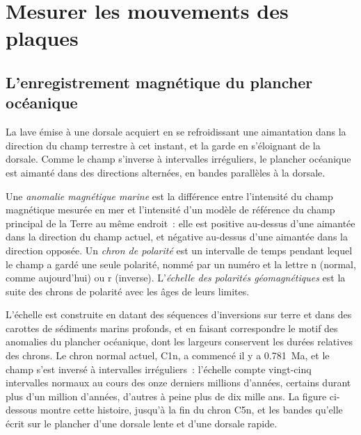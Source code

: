 \section{Mesurer les mouvements des plaques}

\subsection*{L'enregistrement magnétique du plancher océanique}

La lave émise à une dorsale acquiert en se refroidissant une aimantation dans la direction
du champ terrestre à cet instant, et la garde en s'éloignant de la
dorsale. Comme le champ s'inverse à intervalles irréguliers, le plancher océanique est
aimanté dans des directions alternées, en bandes parallèles à la dorsale.

\begin{definition}\label{def:b1:plate-kinematics:magnetic-anomaly}
Une \emph{anomalie magnétique marine} est la
différence entre l'intensité du champ magnétique mesurée en mer et
l'intensité d'un modèle de référence du champ principal de la Terre au même endroit~: elle
est positive au-dessus d'une  aimantée dans la direction du champ actuel, et
négative au-dessus d'une  aimantée dans la direction opposée. Un \emph{chron de
polarité} est un intervalle de temps pendant lequel le champ a gardé
une seule polarité, nommé par un numéro et la lettre n (normal, comme aujourd'hui) ou r
(inverse). L'\emph{échelle des polarités géomagnétiques} est la suite des chrons de polarité avec les âges de leurs
limites.
\end{definition}

L'échelle est construite en datant des séquences d'inversions sur terre et dans des
carottes de sédiments marins profonds, et en faisant correspondre le motif des anomalies du plancher océanique, dont les
largeurs conservent les durées relatives des chrons. Le chron normal actuel, C1n, a commencé
il y a \qty{0.781}{Ma}, et le champ s'est inversé à intervalles irréguliers~:
l'échelle compte vingt-cinq intervalles normaux au cours des onze derniers millions d'années,
certains durant plus d'un million d'années, d'autres à peine plus de dix
mille ans. La
figure ci-dessous montre cette histoire, jusqu'à la fin du chron C5n, et les bandes
qu'elle écrit sur le plancher d'une dorsale lente et d'une dorsale rapide.

